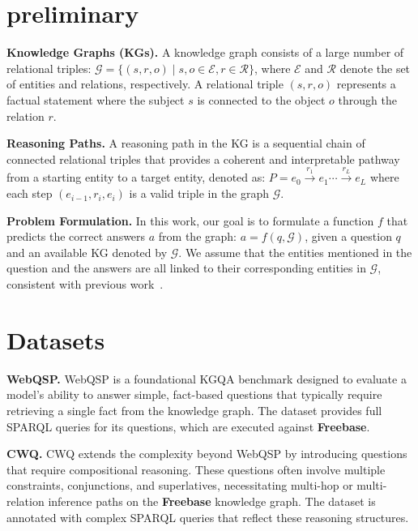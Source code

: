 \section{preliminary}
\label{app:preliminary}
\textbf{Knowledge Graphs (KGs).} A knowledge graph consists of a large number of relational triples: $\mathcal{G} = \{ (s, r, o) \mid s, o \in \mathcal{E}, r \in \mathcal{R} \}$, 
where $\mathcal{E}$ and $\mathcal{R}$ denote the set of entities and relations, respectively.
A relational triple $(s,r,o)$ represents a factual statement where the subject $s$ is connected to the object $o$ through the relation $r$.

\textbf{Reasoning Paths.} A reasoning path in the KG is a sequential chain of connected relational triples that provides a coherent and interpretable pathway from a starting entity to a target entity, denoted as:
$P = e_0 \xrightarrow{r_1} e_1 \cdots \xrightarrow{r_L} e_L$
where each step $(e_{i-1}, r_i, e_i)$ is a valid triple in the graph $\mathcal{G}$.

\textbf{Problem Formulation.} In this work, our goal is to formulate a function $f$ that predicts the correct answers $a$ from the graph: $a = f(q,\mathcal{G})$, given a question $q$ and an available KG denoted by $\mathcal{G}$.
We assume that the entities mentioned in the question and the answers are all linked to their corresponding entities in $\mathcal{G}$, consistent with previous work~\citep{sun-etal-2019-pullnet,luo2024rog}.


\section{Datasets}
\label{app:datasets}


\textbf{WebQSP.}
WebQSP is a foundational KGQA benchmark designed to evaluate a model's ability to answer simple, fact-based questions that typically require retrieving a single fact from the knowledge graph. The dataset provides full SPARQL queries for its questions, which are executed against \textbf{Freebase}.


\textbf{CWQ.}
CWQ extends the complexity beyond WebQSP by introducing questions that require compositional reasoning. These questions often involve multiple constraints, conjunctions, and superlatives, necessitating multi-hop or multi-relation inference paths on the \textbf{Freebase} knowledge graph. The dataset is annotated with complex SPARQL queries that reflect these reasoning structures.


